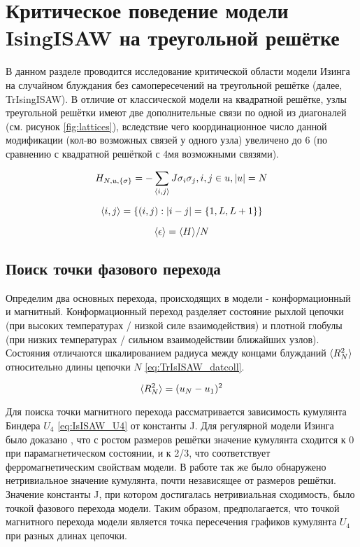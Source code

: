 \section{Критическое поведение модели IsingISAW на треугольной решётке}

В данном разделе проводится исследование критической области модели Изинга на случайном блуждания без самопересечений на треугольной решётке (далее, TrIsingISAW).
В отличие от классической модели на квадратной решётке, узлы треугольной решётки имеют две дополнительные связи по одной из диагоналей (см. рисунок \ref{fig:lattices}), 
вследствие чего координационное число данной модификации (кол-во возможных связей у одного узла) увеличено до 6 (по сравнению с квадратной решёткой с 4мя возможными связями).

\begin{equation}
\label{eq:IsISAW_H}
 H_{N,u,\{\sigma\}} = -\sum_{\langle i,j \rangle} J\sigma_i \sigma_j, i,j \in u, |u| = N
\end{equation}

\begin{equation}
	\langle i,j \rangle = \{(i,j): |i-j| = \{1, L, L+1\} \}
\end{equation}

\begin{equation}
\label{eq:TrIsISAW_E}
\langle \epsilon \rangle = \langle H \rangle / N
\end{equation}

\subsection{Поиск точки фазового перехода}

Определим два основных перехода, происходящих в модели - конформационный и магнитный.
Конформационный переход разделяет состояние рыхлой цепочки (при высоких температурах / низкой силе взаимодействия) и плотной глобулы (при низких температурах / сильном взаимодействии ближайших узлов).
Состояния отличаются шкалированием радиуса между концами блужданий $\langle R^2_N \rangle$ относительно длины цепочки $N$ \eqref{eq:TrIsISAW_datcoll}.

\begin{equation}
	\langle R^2_N \rangle = (u_{N} - u_{1})^2
\end{equation}

Для поиска точки магнитного перехода рассматривается зависимость кумулянта Биндера $U_4$ \eqref{eq:IsISAW_U4} от константы J.
Для регулярной модели Изинга было доказано \cite{Binder1981_Ising}, 
что с ростом размеров решётки значение кумулянта сходится к 0 при парамагнетическом состоянии, 
и к 2/3, что соответствует ферромагнетическим свойствам модели.
В работе \cite{Binder1981_Ising} так же было обнаружено нетривиальное значение кумулянта, почти независящее от размеров решётки.
Значение константы J, при котором достигалась нетривиальная сходимость, было точкой фазового перехода модели.
Таким образом, предполагается, что точкой магнитного перехода модели является 
точка пересечения графиков кумулянта $U_4$ при разных длинах цепочки.

